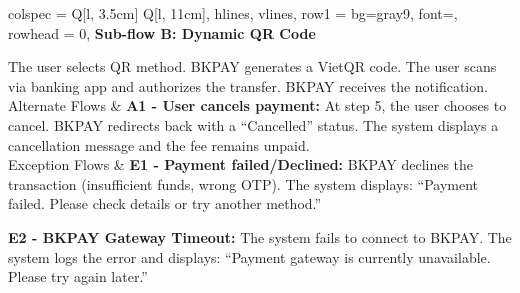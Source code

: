 \begin{longtblr}[
  caption = {UC 3.1: Pay periodic parking fee},
]{
  colspec = {Q[l, 3.5cm] Q[l, 11cm]}, 
  hlines, vlines,
  row{1} = {bg=gray9, font=\bfseries}, 
  rowhead = 0, 
}
\textbf{Sub-flow B: Dynamic QR Code} \par
The user selects QR method. BKPAY generates a VietQR code. The user scans via banking app and authorizes the transfer. BKPAY receives the notification. \\
Alternate Flows & 
\textbf{A1 - User cancels payment:} At step 5, the user chooses to cancel. BKPAY redirects back with a ``Cancelled'' status. The system displays a cancellation message and the fee remains unpaid. \\
Exception Flows & 
\textbf{E1 - Payment failed/Declined:} BKPAY declines the transaction (insufficient funds, wrong OTP). The system displays: ``Payment failed. Please check details or try another method.'' \par \vspace{0.5em}
\textbf{E2 - BKPAY Gateway Timeout:} The system fails to connect to BKPAY. The system logs the error and displays: ``Payment gateway is currently unavailable. Please try again later.'' \\
\end{longtblr}